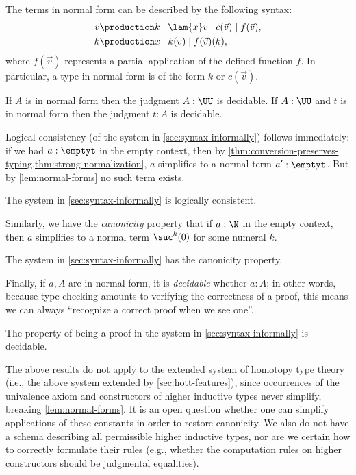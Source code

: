 \begin{lem}\label{lem:normal-forms}
  The terms in normal form can be described by the following syntax:
  \begin{align*}
    v & \production  k \mid \lam{x} v \mid c(\vec{v}) \mid f(\vec{v}), \\
    k &\production x \mid k(v) \mid f(\vec{v})(k),
  \end{align*}
  where $f(\vec{v})$ represents a partial application of the defined function $f$.
  In particular, a type in normal form is of the form $k$ or $c(\vec{v})$.
\end{lem}

\begin{thm}
  If $A$ is in normal form then the 
  judgment $A : \UU$ is decidable. If $A : \UU$ and $t$ is in normal form then the judgment
  $t:A$ is decidable.
\end{thm}

Logical consistency (of the system in \cref{sec:syntax-informally}) follows
immediately: if we had $a:\emptyt$ in the empty context, then by
\cref{thm:conversion-preserves-typing,thm:strong-normalization}, $a$
simplifies to a normal term $a':\emptyt$. But by
\cref{lem:normal-forms} no such term exists.

\begin{cor}
 The system in \cref{sec:syntax-informally} is logically consistent.
\end{cor}

Similarly, we have the \emph{canonicity} property that if $a:\N$ in the empty
context, then $a$ simplifies to a normal term $\suc^k(0)$ for some numeral $k$.

\begin{cor}
 The system in \cref{sec:syntax-informally} has the canonicity property.
\end{cor}

Finally, if $a,A$ are in normal form, it is \emph{decidable} whether $a:A$; in
other words, because type-checking amounts to verifying the correctness of a
proof, this means we can always ``recognize a correct proof when we see one''.

\begin{cor}
The property of being a proof in the system in \cref{sec:syntax-informally} is decidable.
\end{cor}

\mentalpause

The above results do not apply to the extended system of homotopy type
theory (i.e., the above system extended by \cref{sec:hott-features}), since
occurrences of the univalence axiom and constructors of higher inductive types
never simplify, breaking \cref{lem:normal-forms}. It is an open question
whether one can simplify applications of these constants in order to restore
canonicity. We also do not have a schema describing all permissible higher
inductive types, nor are we certain how to correctly formulate their rules
(e.g., whether the computation rules on higher constructors should be judgmental
equalities).


